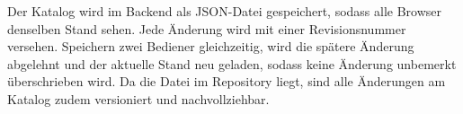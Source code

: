 Der Katalog wird im Backend als JSON-Datei gespeichert, sodass alle Browser denselben Stand sehen. Jede Änderung wird mit einer Revisionsnummer versehen. Speichern zwei Bediener gleichzeitig, wird die spätere Änderung abgelehnt und der aktuelle Stand neu geladen, sodass keine Änderung unbemerkt überschrieben wird. Da die Datei im Repository liegt, sind alle Änderungen am Katalog zudem versioniert und nachvollziehbar.
